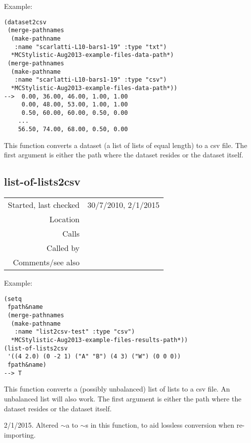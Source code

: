 \vspace{0.5cm}
\noindent Example:
\begin{verbatim}
(dataset2csv
 (merge-pathnames
  (make-pathname
   :name "scarlatti-L10-bars1-19" :type "txt")
  *MCStylistic-Aug2013-example-files-data-path*)
 (merge-pathnames
  (make-pathname
   :name "scarlatti-L10-bars1-19" :type "csv")
  *MCStylistic-Aug2013-example-files-data-path*))
-->  0.00, 36.00, 46.00, 1.00, 1.00
     0.00, 48.00, 53.00, 1.00, 1.00
     0.50, 60.00, 60.00, 0.50, 0.00
    ...
    56.50, 74.00, 68.00, 0.50, 0.00
\end{verbatim}

\noindent This function converts a dataset (a list of
lists of equal length) to a csv file. The first
argument is either the path where the dataset resides
or the dataset itself.

\subsection*{list-of-lists2csv}\label{fun:list-of-lists2csv}

\vspace{0.3cm}
\begin{tabular}{r|p{8cm}}
Started, last checked & 30/7/2010, 2/1/2015 \\
Location & \nameref{sec:csv-files} \\
Calls & \nameref{fun:read-from-file} \\
Called by & \nameref{fun:comma-separated-integers2list} \\
Comments/see also & \nameref{fun:dataset2csv}
\end{tabular}

\vspace{0.5cm}
\noindent Example:
\begin{verbatim}
(setq
 fpath&name
 (merge-pathnames
  (make-pathname
   :name "list2csv-test" :type "csv")
  *MCStylistic-Aug2013-example-files-results-path*))
(list-of-lists2csv
 '((4 2.0) (0 -2 1) ("A" "B") (4 3) ("W") (0 0 0)) 
 fpath&name)
--> T
\end{verbatim}

\noindent This function converts a (possibly
unbalanced) list of lists to a csv file. An unbalanced
list will also work. The first argument is either the
path where the dataset resides or the dataset
itself.

2/1/2015. Altered $\sim$a to $\sim$s in this function,
to aid lossless conversion when re-importing.


